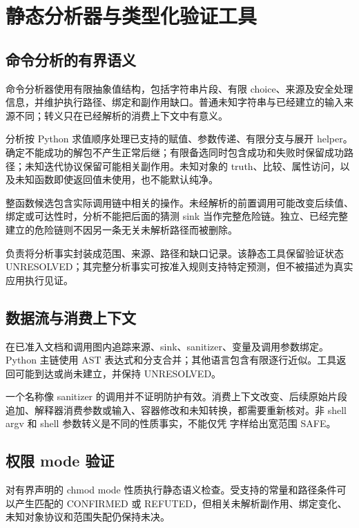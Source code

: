 \section{静态分析器与类型化验证工具}
\subsection{命令分析的有界语义}
命令分析器使用有限抽象值结构，包括字符串片段、有限 choice、来源及安全处理信息，并维护执行路径、绑定和副作用缺口。普通未知字符串与已经建立的输入来源不同；转义只在已经解析的消费上下文中有意义。

分析按 Python 求值顺序处理已支持的赋值、参数传递、有限分支与展开 helper。确定不能成功的解包不产生正常后继；有限备选同时包含成功和失败时保留成功路径；未知迭代协议保留可能相关副作用。未知对象的 truth、比较、属性访问，以及未知函数即使返回值未使用，也不能默认纯净。

整函数候选包含实际调用链中相关的操作。未经解析的前置调用可能改变后续值、绑定或可达性时，分析不能把后面的猜测 sink 当作完整危险链。独立、已经完整建立的危险链则不因另一条无关未解析路径而被删除。

 负责将分析事实封装成范围、来源、路径和缺口记录。该静态工具保留验证状态 UNRESOLVED；其完整分析事实可按准入规则支持特定预测，但不被描述为真实应用执行见证。

\subsection{数据流与消费上下文}
 在已准入文档和调用图内追踪来源、sink、sanitizer、变量及调用参数绑定。Python 主链使用 AST 表达式和分支合并；其他语言包含有限逐行近似。工具返回可能到达或尚未建立，并保持 UNRESOLVED。

一个名称像 sanitizer 的调用并不证明防护有效。消费上下文改变、后续原始片段追加、解释器消费参数或输入、容器修改和未知转换，都需要重新核对。非 shell argv 和 shell 参数转义是不同的性质事实，不能仅凭  字样给出宽范围 SAFE。

\subsection{权限 mode 验证}
 对有界声明的 chmod mode 性质执行静态语义检查。受支持的常量和路径条件可以产生匹配的 CONFIRMED 或 REFUTED，但相关未解析副作用、绑定变化、未知对象协议和范围失配仍保持未决。

